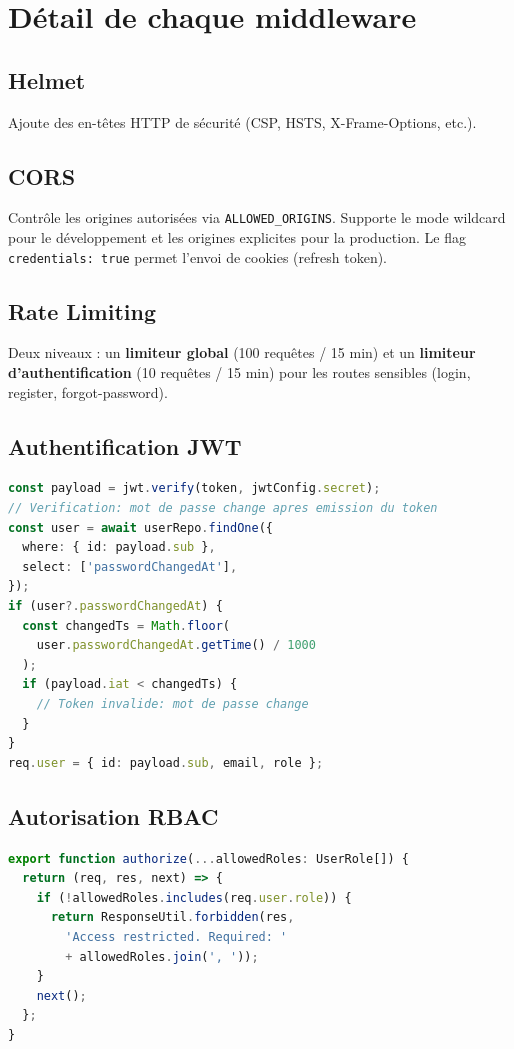 \documentclass[12pt,a4paper]{report}
\begin{document}
\section{Détail de chaque middleware}

\subsection{Helmet}
Ajoute des en-têtes HTTP de sécurité (CSP, HSTS, X-Frame-Options, etc.).

\subsection{CORS}
Contrôle les origines autorisées via \texttt{ALLOWED\_ORIGINS}. Supporte le mode wildcard pour le développement et les origines explicites pour la production. Le flag \texttt{credentials: true} permet l'envoi de cookies (refresh token).

\subsection{Rate Limiting}
Deux niveaux : un \textbf{limiteur global} (100 requêtes / 15 min) et un \textbf{limiteur d'authentification} (10 requêtes / 15 min) pour les routes sensibles (login, register, forgot-password).

\subsection{Authentification JWT}
\begin{lstlisting}[language=TypeScript,title={auth.middleware.ts -- Extrait}]
const payload = jwt.verify(token, jwtConfig.secret);
// Verification: mot de passe change apres emission du token
const user = await userRepo.findOne({
  where: { id: payload.sub },
  select: ['passwordChangedAt'],
});
if (user?.passwordChangedAt) {
  const changedTs = Math.floor(
    user.passwordChangedAt.getTime() / 1000
  );
  if (payload.iat < changedTs) {
    // Token invalide: mot de passe change
  }
}
req.user = { id: payload.sub, email, role };
\end{lstlisting}

\subsection{Autorisation RBAC}
\begin{lstlisting}[language=TypeScript,title={roles.middleware.ts}]
export function authorize(...allowedRoles: UserRole[]) {
  return (req, res, next) => {
    if (!allowedRoles.includes(req.user.role)) {
      return ResponseUtil.forbidden(res,
        'Access restricted. Required: '
        + allowedRoles.join(', '));
    }
    next();
  };
}
\end{lstlisting}
\end{document}

